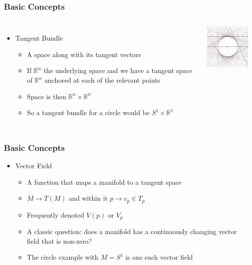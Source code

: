 \documentclass[10pt]{beamer}
\begin{document}
\begin{frame}
  \frametitle{Basic Concepts}
  \begin{columns}
    \column{7cm}
    \begin{itemize}
    \item Tangent Bundle
      \begin{itemize}
      \item A space along with its tangent vectors
      \item If $\mathbb{R}^n$ the underlying space and we have a
        tangent space of $\mathbb{R}^n$ anchored at each of the
        relevant points
      \item Space is then $\mathbb{R}^n \times \mathbb{R}^n$
      \item So a tangent bundle for a circle would be $S^1 \times \mathbb{R}^1$
      \end{itemize}
    \end{itemize}
    \column{4cm}
    \vfill
    \centerline{\includegraphics[width=3.8cm]{circle-bundle}}
    \vfill
  \end{columns}
\end{frame}

\begin{frame}
  \frametitle{Basic Concepts}
  \begin{itemize}
  \item Vector Field
    \begin{itemize}
    \item A function that maps a manifold to a tangent space
    \item $M \rightarrow T(M)$ and within it $p \rightarrow v_p \in T_p$ 
    \item Frequently denoted $V(p)$ or $V_p$ 
    \item A classic question: does a manifold has a continuously
      changing vector field that is non-zero?  \pause
    \item The circle example with $M=S^1$ is one such vector field
    \end{itemize}
  \end{itemize}
\end{frame}
\end{document}

